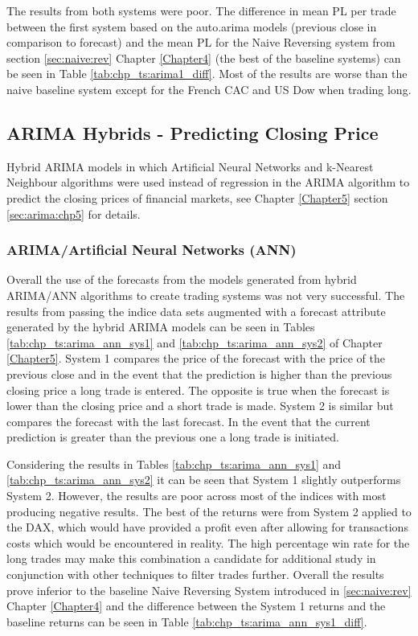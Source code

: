 The results from both systems were poor. The difference in mean PL per trade between the first system based on the auto.arima models (previous close in comparison to forecast) and the mean PL for the Naive Reversing system from section \ref{sec:naive:rev} Chapter \ref{Chapter4} (the best of the baseline systems) can be seen in Table \ref{tab:chp_ts:arima1_diff}. Most of the results are worse than the naive baseline system except for the French CAC and US Dow when trading long.



\subsection{ARIMA Hybrids - Predicting Closing Price}
Hybrid ARIMA models in which Artificial Neural Networks and k-Nearest Neighbour algorithms were used instead of regression in the ARIMA algorithm to predict the closing prices of financial markets, see Chapter \ref{Chapter5} section \ref{sec:arima:chp5} for details.

\subsubsection{ARIMA/Artificial Neural Networks (ANN)}
\label{sec:cp:ann}
Overall the use of the forecasts from the models generated from hybrid ARIMA/ANN algorithms to create trading systems was not very successful. The results from passing the indice data sets augmented with a forecast attribute generated by the hybrid ARIMA models can be seen in Tables  \ref{tab:chp_ts:arima_ann_sys1} and \ref{tab:chp_ts:arima_ann_sys2} of Chapter \ref{Chapter5}. System 1 compares the price of the forecast with the price of the previous close and in the event that the prediction is higher than the previous closing price a long trade is entered. The opposite is true when the forecast is lower than the closing price and a short trade is made. System 2 is similar but compares the forecast with the last forecast. In the event that the current prediction is greater than the previous one a long trade is initiated.

Considering the results in Tables \ref{tab:chp_ts:arima_ann_sys1} and \ref{tab:chp_ts:arima_ann_sys2} it can be seen that System 1 slightly outperforms System 2. However, the results are poor across most of the indices with most producing negative results. The best of the returns were from System 2 applied to the DAX, which would have provided a profit even after allowing for transactions costs which would be encountered in reality. The high percentage win rate for the long trades may make this combination a candidate for additional study in conjunction with other techniques to filter trades further.  Overall the results prove inferior to the baseline Naive Reversing System introduced in \ref{sec:naive:rev} Chapter \ref{Chapter4} and the difference between the System 1 returns and the baseline returns can be seen in Table \ref{tab:chp_ts:arima_ann_sys1_diff}.

